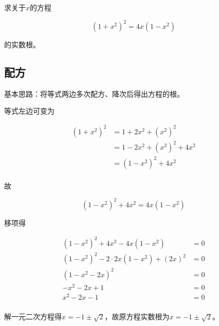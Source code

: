 

求关于$x$的方程

\[ (1 + x^2)^2 = 4x(1 - x^2) \]

的实数根。


\subsection{配方}

基本思路：将等式两边多次配方、降次后得出方程的根。

等式左边可变为

\begin{align*}
  (1 + x^2)^2 &= 1 + 2x^2 + (x^2)^2 \\
  &= 1 - 2x^2 + (x^2)^2 + 4x^2 \\
  &= (1 - x^2)^2 + 4x^2 \\
\end{align*}

故

\[ (1 - x^2)^2 + 4x^2 = 4x(1 - x^2) \]

移项得

\begin{align*}
  (1 - x^2)^2 + 4x^2 - 4x(1 - x^2) &= 0 \\
  (1 - x^2)^2 - 2\cdot2x(1 - x^2) + (2x)^2 &= 0 \\
  (1 - x^2 - 2x)^2 &= 0 \\
  -x^2 - 2x + 1 &= 0 \\
  x^2 - 2x - 1 &= 0 \\
\end{align*}

解一元二次方程得$x = -1 \pm\sqrt2$，故原方程实数根为$x = -1 \pm\sqrt2$。
